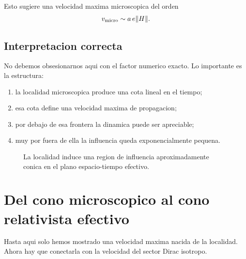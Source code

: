 Esto sugiere una velocidad maxima microscopica del orden
\begin{equation}
v_{\text{micro}} \sim a\,e\norm{H}.
\label{c19:eq:vmicro}
\end{equation}

\subsection{Interpretacion correcta}
No debemos obsesionarnos aqui con el factor numerico exacto. Lo importante es la estructura:
\begin{enumerate}[label=\arabic*.]
    \item la localidad microscopica produce una cota lineal en el tiempo;
    \item esa cota define una velocidad maxima de propagacion;
    \item por debajo de esa frontera la dinamica puede ser apreciable;
    \item muy por fuera de ella la influencia queda exponencialmente pequena.
\end{enumerate}

\begin{figure}[h!]
\centering
{}
\caption{La localidad induce una region de influencia aproximadamente conica en el plano espacio-tiempo efectivo.}
\end{figure}

\section{Del cono microscopico al cono relativista efectivo}
Hasta aqui solo hemos mostrado una velocidad maxima nacida de la localidad. Ahora hay que conectarla con la velocidad del sector Dirac isotropo.

